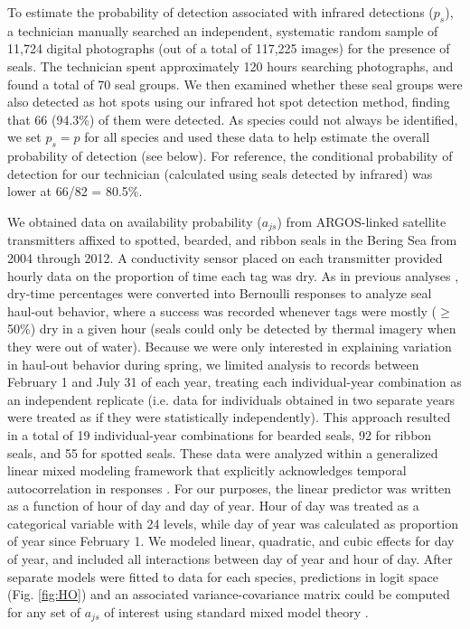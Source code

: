 \documentclass[12pt,fleqn]{article}
\begin{document}
\begin{flushleft}
\hspace{.5in}To estimate the probability of detection associated with infrared detections ($p_s$), a technician manually searched an independent, systematic random sample of 11,724 digital photographs (out of a total of 117,225 images) for the presence of seals.  The technician spent approximately 120 hours searching photographs, and found a total of 70 seal groups. We then examined whether these seal groups were also detected as hot spots using our infrared hot spot detection method, finding that 66 (94.3\%) of them were detected.  As species could not always be identified, we set $p_s=p$ for all species and used these data to help estimate the overall probability of detection (see below).  For reference, the conditional probability of detection for our technician (calculated using seals detected by infrared) was lower at 66/82 = 80.5\%.

\hspace{.5in}We obtained data on availability probability ($a_{js}$) from ARGOS-linked satellite transmitters affixed to spotted, bearded, and ribbon seals in the Bering Sea from 2004 through 2012.  A conductivity sensor placed on each transmitter provided hourly data on the proportion of time each tag was dry.  As in previous analyses \citep[e.g.][]{BengtsonEtAl2005,VerHoefEtAl2010}, dry-time percentages were converted into Bernoulli responses to analyze seal haul-out behavior, where a success was recorded whenever tags were mostly ($\ge$50\%) dry in a given hour (seals could only be detected by thermal imagery when they were out of water).  Because we were only interested in explaining variation in haul-out behavior during spring, we limited analysis to records between February 1 and July 31 of each year, treating each individual-year combination as an independent replicate (i.e. data for individuals obtained in two separate years were treated as if they were statistically independently).  This approach resulted in a total of 19 individual-year combinations for bearded seals, 92 for ribbon seals, and 55 for spotted seals.  These data were analyzed within a generalized linear mixed modeling framework that explicitly acknowledges temporal autocorrelation in responses \citep[see ][]{VerHoefEtAl2010}.  For our purposes, the linear predictor was written as a function of hour of day and day of year.  Hour of day was treated as a categorical variable with 24 levels, while day of year was calculated as proportion of year since February 1.  We modeled linear, quadratic, and cubic effects for day of year, and included all interactions between day of year and hour of day.  After separate models were fitted to data for each species, predictions in logit space (Fig. \ref{fig:HO}) and an associated variance-covariance matrix could be computed for any set of $a_{js}$ of interest using standard mixed model theory \citep[see e.g.][]{LittellEtAl1996,VerHoefEtAl2013}.


\end{flushleft}
\end{document}
